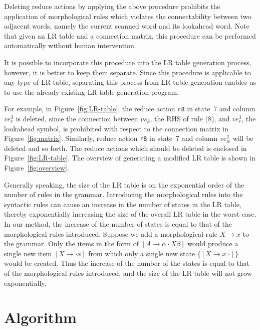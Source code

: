 Deleting reduce actions by applying the above procedure prohibits the
application of morphological rules which violates the connectability
between two adjacent words, namely the current scanned word and its
lookahead word. Note that given an LR table and a connection matrix,
this procedure can be performed automatically without human
intervention.

It is possible to incorporate this procedure into the LR table
generation process, however, it is better to keep them separate.
Since this procedure is applicable to any type of LR table, separating
this process from LR table generation enables us to use the already
existing LR table generation program.

For example, in Figure~\ref{fig:LR-table}, the reduce action {\tt r8}
in state~7 and column $ve_r^3$ is deleted, since the connection
between $vs_k$, the RHS of rule (8), and $ve_r^3$, the lookahead
symbol, is prohibited with respect to the connection matrix in
Figure~\ref{fig:matrix}. Similarly, reduce action {\tt r8} in state~7
and column $ve_w^2$ will be deleted and so forth. The reduce actions
which should be deleted is enclosed in Figure~\ref{fig:LR-table}.  The
overview of generating a modified LR table is shown in
Figure~\ref{fig:overview}.

Generally speaking, the size of the LR table is on the exponential
order of the number of rules in the grammar. Introducing the
morphological rules into the syntactic rules can cause an increase in
the number of states in the LR table, thereby exponentially increasing
the size of the overall LR table in the worst case. In our method, the
increase of the number of states is equal to that of the morphological
rules introduced. Suppose we add a morphological rule $X \to x$ to the
grammar. Only the items in the form of $[A \to \alpha \cdot X \beta]$
would produce a single new item $[X \to \cdot x]$ from which only a
single new state $\{[X \to x \cdot]\}$ would be created. Thus the
increase of the number of the states is equal to that of the
morphological rules introduced, and the size of the LR table will not
grow exponentially.

\begin{center}
  \unitlength=1mm
  
\end{center}

\section{Algorithm}
\label{sec:algorithm}

